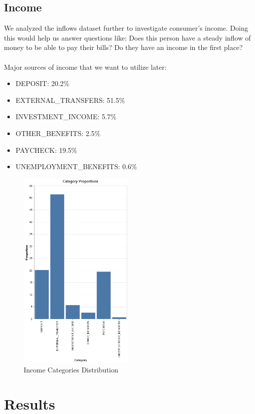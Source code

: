 \documentclass[12pt,letterpaper]{article}
\begin{document}
\subsection{Income}
{We analyzed the inflows dataset further to investigate consumer’s income. Doing this would help us answer questions like: Does this person have a steady inflow of money to be able to pay their bills? Do they have an income in the first place? \\ \\ Major sources of income that we want to utilize later:}
\begin{itemize}
    \item {DEPOSIT}: 20.2\%
    \item {EXTERNAL\_TRANSFERS}: 51.5\%
    \item {INVESTMENT\_INCOME}: 5.7\%
    \item {OTHER\_BENEFITS}: 2.5\%
    \item {PAYCHECK}: 19.5\%
    \item {UNEMPLOYMENT\_BENEFITS}: 0.6\%
\end{itemize}

\begin{figure}[H]
    \centering
    \includegraphics[width=0.5\textwidth]{figure/income.png}
    \caption{Income Categories Distribution}
    \label{fig:enter-label}
\end{figure}



\section{Results}
\end{document}
